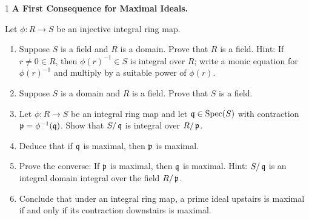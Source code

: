 \documentclass[Notebook.tex]{subfiles}
\begin{document}
\begin{problem}{1}
    \textbf{A First Consequence for Maximal Ideals.} 
    
    Let $\phi:R \to S$ be an injective integral ring map.
    \begin{enumerate}
        \item Suppose $S$ is a field and $R$ is a domain. Prove that $R$ is a field. Hint: If $r \neq 0 \in R$, then $\phi(r)^{-1}\in S$ is integral over $R$; write a monic equation for $\phi(r)^{-1}$ and multiply by a suitable power of $\phi(r)$.
        \item Suppose $S$ is a domain and $R$ is a field. Prove that $S$ is a field.
        \item Let $\phi:R\to S$ be an integral ring map and let $\operatorname{\mathfrak{q}}\in\operatorname{Spec}(S)$ with contraction $\operatorname{\mathfrak{p}}=\phi^{-1}(\operatorname{\mathfrak{q}})$. Show that $S/\operatorname{\mathfrak{q}}$ is integral over $R/\operatorname{\mathfrak{p}}$.
        \item Deduce that if $\operatorname{\mathfrak{q}}$ is maximal, then $\operatorname{\mathfrak{p}}$ is maximal.
        \item Prove the converse: If $\operatorname{\mathfrak{p}}$ is maximal, then $\operatorname{\mathfrak{q}}$ is maximal. Hint: $S/\operatorname{\mathfrak{q}}$ is an integral domain integral over the field $R/\operatorname{\mathfrak{p}}$.
        \item Conclude that under an integral ring map, a prime ideal upstairs is maximal if and only if its contraction downstairs is maximal.
    \end{enumerate}
\end{problem}
\end{document}

